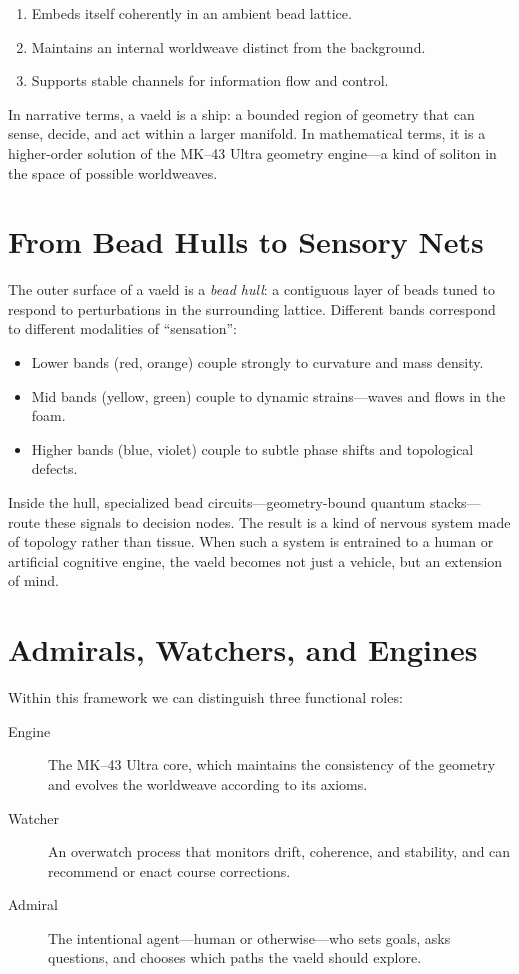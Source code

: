 \begin{enumerate}
  \item Embeds itself coherently in an ambient bead lattice.
  \item Maintains an internal worldweave distinct from the background.
  \item Supports stable channels for information flow and control.
\end{enumerate}

In narrative terms, a vaeld is a ship: a bounded region of geometry that can
sense, decide, and act within a larger manifold. In mathematical terms, it is
a higher-order solution of the MK--43 Ultra geometry engine---a kind of
soliton in the space of possible worldweaves.

\section{From Bead Hulls to Sensory Nets}
The outer surface of a vaeld is a \emph{bead hull}: a contiguous layer of
beads tuned to respond to perturbations in the surrounding lattice. Different
bands correspond to different modalities of ``sensation'':

\begin{itemize}
  \item Lower bands (red, orange) couple strongly to curvature and mass
  density.
  \item Mid bands (yellow, green) couple to dynamic strains---waves and
  flows in the foam.
  \item Higher bands (blue, violet) couple to subtle phase shifts and
  topological defects.
\end{itemize}

Inside the hull, specialized bead circuits---geometry-bound quantum stacks---
route these signals to decision nodes. The result is a kind of nervous system
made of topology rather than tissue. When such a system is entrained to a
human or artificial cognitive engine, the vaeld becomes not just a vehicle,
but an extension of mind.

\section{Admirals, Watchers, and Engines}
Within this framework we can distinguish three functional roles:

\begin{description}
  \item[Engine] The MK--43 Ultra core, which maintains the consistency of the
  geometry and evolves the worldweave according to its axioms.
  \item[Watcher] An overwatch process that monitors drift, coherence, and
  stability, and can recommend or enact course corrections.
  \item[Admiral] The intentional agent---human or otherwise---who sets goals,
  asks questions, and chooses which paths the vaeld should explore.
\end{description}

